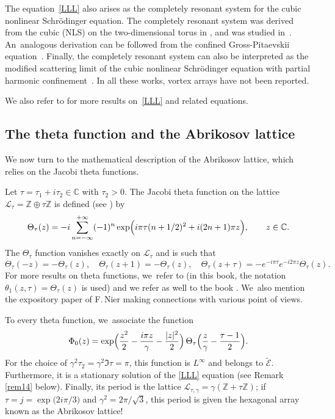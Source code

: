 \documentclass[JEP,XML,SOM,Unicode,NoFloatCountersInSection,published]{cedram}
\theoremstyle{definition}
\let\EE\exp
\newcommand\C{\mathbb C}
\begin{document}
The equation~\eqref{LLL} also arises as the completely resonant system for the cubic nonlinear Schrödinger equation. The completely resonant system was derived from the cubic (NLS) on the two-dimensional torus in \cite{FGH}, and was studied in~\cite{GHT, GHT2}. An~analogous derivation can be followed from the confined Gross-Pitaevskii equation~\cite{MeSpa,FMS}. Finally, the completely resonant system can also be interpreted as the modified scattering limit of the cubic nonlinear Schrödinger equation with partial harmonic confinement~\cite{H-T}. In all these works, vortex arrays have not been reported.

We also refer to \cite{GT, BiBiCrEv, BiBiEv, Clerck-Evnin, Sch} for more results on~\eqref{LLL} and related equations.

\subsection{The theta function and the Abrikosov lattice} We now turn to the mathematical description of the Abrikosov lattice, which relies on the Jacobi theta functions.

Let $\tau=\tau_1+i \tau_2 \in \C$ with $\tau_2>0$. The Jacobi theta function on the lattice $ \mathcal{L}_\tau = \mathbb{Z}\oplus \tau \mathbb{Z}$ is defined (see \cite[Chap.\,V]{Cha}) by
\begin{equation*}
\Theta_{\tau}(z)=-i \sum_{n=-\infty}^{+\infty} (-1)^n \EE\Bigl({i\pi \tau (n+1/2)^2}+{i(2n+1)\pi z}\Bigr), \qquad z\in \C.
\end{equation*}
The $\Theta_{\tau}$ function vanishes exactly on $\mathcal{L}_\tau$ and is such that
\begin{equation}\label{star}
\Theta_{\tau}(-z)=-\Theta_{\tau}(z),\quad \Theta_{\tau}(z+1)=-\Theta_{\tau}(z),\quad \Theta_{\tau}(z+\tau)=-e^{-i \pi \tau}e^{-i 2\pi z}\Theta_{\tau}(z).
\end{equation}
For more results on theta functions, we~refer to \cite[\S 4]{Godement} (in this book, the notation $\theta_1(z, \tau)=\Theta_{\tau}(z)$ is used) and we refer as well to the book \cite{Mumford}. We~also mention the expository paper \cite{Nier2} of F.\,Nier making connections with various point of views.

To every theta function, we~associate the function
\[
\Phi_0(z) = \EE\Bigl(\frac{z^2}2 - \frac{{i \pi}z} {\gamma} - \frac{|z|^2}2\Bigr) \,\Theta_\tau \Bigl(\frac{z}{\gamma} - \frac{\tau-1}{2} \Bigr).
\]
For the choice of $\gamma^2 \tau_2 = \gamma^2 \Im \tau= \pi$, this function is $L^\infty$ and belongs to $\widetilde {\mathcal E}$. Furthermore, it is a stationary solution of the \eqref{LLL} equation (see Remark \ref{rem14} below). Finally, its period is the lattice $\mathcal{L}_{\tau,\gamma}=\gamma (\mathbb{Z} + \tau \mathbb{Z})$;
if $\tau = j = \EE\bigl({{2i \pi}/{3}}\bigr)$ and $\gamma^2 = {2\pi}/{\sqrt{3}}$, this period is given the hexagonal array known as the Abrikosov lattice!
\end{document}
